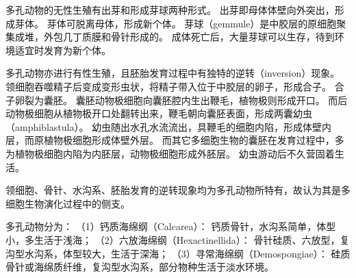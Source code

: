 \documentclass[11pt]{article}
\begin{document}
\newline

多孔动物的无性生殖有出芽和形成芽球两种形式。
出芽即母体体壁向外突出，形成芽体。
芽体可脱离母体，形成新个体。
芽球（gemmule）是中胶层的原细胞聚集成堆，外包几丁质膜和骨针形成的。
成体死亡后，大量芽球可以生存，待到环境适宜时发育为新个体。

\newline

多孔动物亦进行有性生殖，且胚胎发育过程中有独特的逆转（inversion）现象。
领细胞吞噬精子后变成变形虫状，将精子带入位于中胶层的卵子，形成合子。
合子卵裂为囊胚。
囊胚动物极细胞向囊胚腔内生出鞭毛，植物极则形成开口。
而后动物极细胞从植物极开口处翻转出来，鞭毛朝向囊胚表面，形成两囊幼虫（amphiblastula）。
幼虫随出水孔水流流出，具鞭毛的细胞内陷，形成体壁内层，而原植物极细胞形成体壁外层。
而其它多细胞生物的囊胚在发育过程中，多为植物极细胞内陷为内胚层，动物极细胞形成外胚层。
幼虫游动后不久营固着生活。

\newline

领细胞、骨针、水沟系、胚胎发育的逆转现象均为多孔动物所特有，故认为其是多细胞生物演化过程中的侧支。

\newline

多孔动物分为：
（1）钙质海绵纲（Calcarea）：
钙质骨针，水沟系简单，体型小，多生活于浅海；
（2）六放海绵纲（Hexactinellida）：
骨针硅质、六放型，复沟型水沟系，体型较大，生活于深海；
（3）寻常海绵纲（Demospongiae）：
硅质骨针或海绵质纤维，复沟型水沟系，部分物种生活于淡水环境。
  
\end{document}
